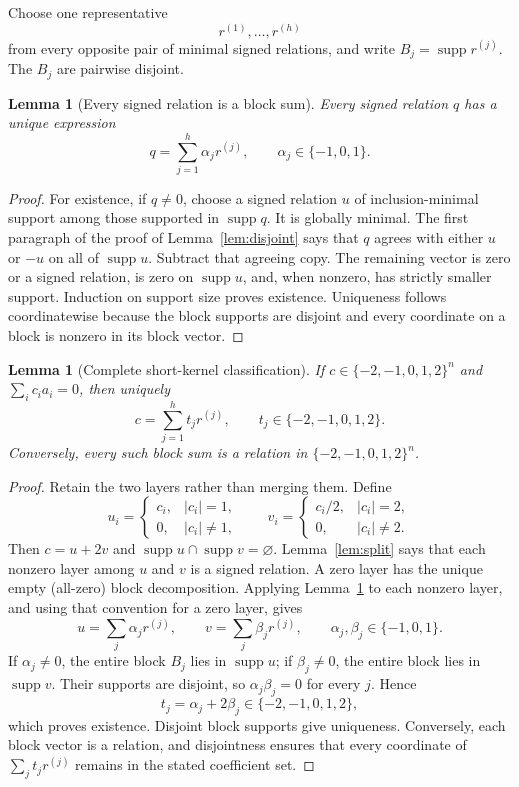 \documentclass[11pt]{article}
\newtheorem{lemma}[theorem]{Lemma}
\theoremstyle{remark}
\newcommand{\supp}{\operatorname{supp}}
\begin{document}
Choose one representative
\[
  r^{(1)},\ldots,r^{(h)}
\]
from every opposite pair of minimal signed relations, and write
$B_j=\supp r^{(j)}$.  The $B_j$ are pairwise disjoint.

\begin{lemma}[Every signed relation is a block sum]\label{lem:signed-decomp}
Every signed relation $q$ has a unique expression
\[
  q=\sum_{j=1}^h\alpha_j r^{(j)},
  \qquad \alpha_j\in\{-1,0,1\}.
\]
\end{lemma}

\begin{proof}
For existence, if $q\ne0$, choose a signed relation $u$ of inclusion-minimal
support among those supported in $\supp q$.  It is globally minimal.  The
first paragraph of the proof of Lemma~\ref{lem:disjoint} says that $q$ agrees
with either $u$ or $-u$ on all of $\supp u$.  Subtract that agreeing copy.
The remaining vector is zero or a signed relation, is zero on $\supp u$, and,
when nonzero, has strictly smaller support.  Induction on support size proves
existence.
Uniqueness follows coordinatewise because the block supports are disjoint and
every coordinate on a block is nonzero in its block vector.
\end{proof}

\begin{lemma}[Complete short-kernel classification]\label{lem:short-kernel}
If $c\in\{-2,-1,0,1,2\}^n$ and $\sum_i c_i a_i=0$, then uniquely
\[
  c=\sum_{j=1}^h t_j r^{(j)},
  \qquad t_j\in\{-2,-1,0,1,2\}.
\]
Conversely, every such block sum is a relation in
$\{-2,-1,0,1,2\}^n$.
\end{lemma}

\begin{proof}
Retain the two layers rather than merging them.  Define
\[
  u_i=\begin{cases}c_i,&|c_i|=1,\\0,&|c_i|\ne1,\end{cases}
  \qquad
  v_i=\begin{cases}c_i/2,&|c_i|=2,\\0,&|c_i|\ne2.\end{cases}
\]
Then $c=u+2v$ and $\supp u\cap\supp v=\varnothing$.  Lemma~\ref{lem:split}
says that each nonzero layer among $u$ and $v$ is a signed relation.  A zero
layer has the unique empty (all-zero) block decomposition.  Applying
Lemma~\ref{lem:signed-decomp} to each nonzero layer, and using that convention
for a zero layer, gives
\[
  u=\sum_j\alpha_jr^{(j)},
  \qquad v=\sum_j\beta_jr^{(j)},
  \qquad \alpha_j,\beta_j\in\{-1,0,1\}.
\]
If $\alpha_j\ne0$, the entire block $B_j$ lies in $\supp u$; if
$\beta_j\ne0$, the entire block lies in $\supp v$.  Their supports are
disjoint, so $\alpha_j\beta_j=0$ for every $j$.  Hence
\[
  t_j=\alpha_j+2\beta_j\in\{-2,-1,0,1,2\},
\]
which proves existence.  Disjoint block supports give uniqueness.  Conversely,
each block vector is a relation, and disjointness ensures that every coordinate
of $\sum_jt_jr^{(j)}$ remains in the stated coefficient set.
\end{proof}
\end{document}

